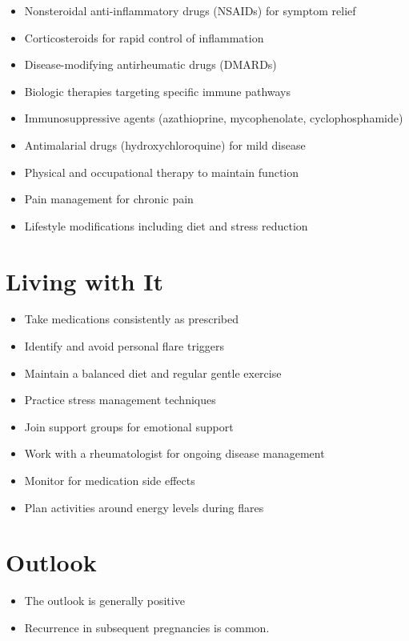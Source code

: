 \begin{itemize}[noitemsep]
  \item Nonsteroidal anti-inflammatory drugs (NSAIDs) for symptom relief
  \item Corticosteroids for rapid control of inflammation
  \item Disease-modifying antirheumatic drugs (DMARDs)
  \item Biologic therapies targeting specific immune pathways
  \item Immunosuppressive agents (azathioprine, mycophenolate, cyclophosphamide)
  \item Antimalarial drugs (hydroxychloroquine) for mild disease
  \item Physical and occupational therapy to maintain function
  \item Pain management for chronic pain
  \item Lifestyle modifications including diet and stress reduction
\end{itemize}
\section{Living with It}
\begin{itemize}[noitemsep]
  \item Take medications consistently as prescribed
  \item Identify and avoid personal flare triggers
  \item Maintain a balanced diet and regular gentle exercise
  \item Practice stress management techniques
  \item Join support groups for emotional support
  \item Work with a rheumatologist for ongoing disease management
  \item Monitor for medication side effects
  \item Plan activities around energy levels during flares
\end{itemize}
\section{Outlook}
\begin{itemize}[noitemsep]
  \item The outlook is generally positive
  \item Recurrence in subsequent pregnancies is common.
\end{itemize}
